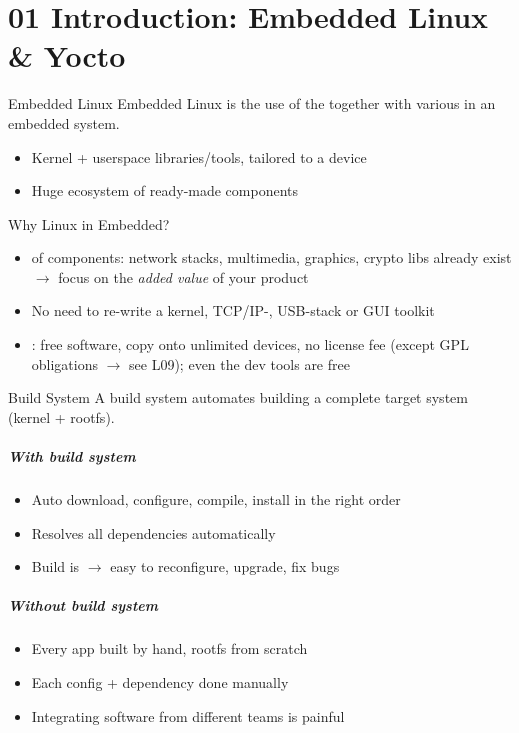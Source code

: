 \section{01 Introduction: Embedded Linux \& Yocto}

\begin{concept}{Embedded Linux}
    Embedded Linux is the use of the  together with various
     in an embedded system.
    \begin{itemize}
        \item Kernel + userspace libraries/tools, tailored to a device
        \item Huge ecosystem of ready-made components
    \end{itemize}
\end{concept}

\begin{remark}
    Why Linux in Embedded?
    \begin{itemize}
        \item {} of components: network stacks, multimedia,
              graphics, crypto libs already exist $\rightarrow$ focus on the
              \emph{added value} of your product
        \item No need to re-write a kernel, TCP/IP-, USB-stack or GUI toolkit
        \item {}: free software, copy onto unlimited devices,
              no license fee (except GPL obligations $\rightarrow$ see L09);
              even the dev tools are free
    \end{itemize}
\end{remark}

\begin{concept}{Build System}
    A build system automates building a complete target system (kernel + rootfs).
    \subparagraph{With build system}
    \begin{itemize}
        \item Auto download, configure, compile, install in the right order
        \item Resolves all dependencies automatically
        \item Build is  $\rightarrow$ easy to reconfigure,
              upgrade, fix bugs
    \end{itemize}
    \subparagraph{Without build system}
    \begin{itemize}
        \item Every app built by hand, rootfs from scratch
        \item Each config + dependency done manually
        \item Integrating software from different teams is painful
    \end{itemize}
    \multend
\end{concept}

